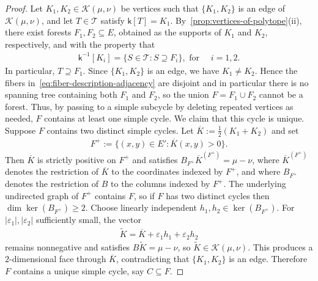 \documentclass[10pt,a4paper]{amsart}
\newcommand{\setoftrees}{{\mathcal{T}}}
\newcommand{\embedding}{{\mathsf{k}}}
\newcommand{\flowpoly}{{\mathcal{K}}}
\begin{document}
    \begin{proof}
        Let $K_1, K_2\in\flowpoly(\mu,\nu)$ be vertices such that $\{K_1,K_2\}$ is an edge of $\flowpoly(\mu,\nu)$, and let $T\in\setoftrees$ satisfy $\embedding[T]=K_1$. By~\cref{prop:vertices-of-polytope}(ii), there exist forests $F_1,F_2\subseteq E$, obtained as the supports of $K_1$ and $K_2$, respectively, and with the property that
            \begin{align}\label{eq:fiber-description-adjacency}
                \embedding^{-1}[K_i] = \{S\in\setoftrees: S\supseteq F_i\},\text{ for }\quad i=1,2.
            \end{align}
        In particular, $T\supseteq F_1$. Since $\{K_1,K_2\}$ is an edge, we have $K_1\neq K_2$. Hence the fibers in~\cref{eq:fiber-description-adjacency} are disjoint and in particular there is no spanning tree containing both $F_1$ and $F_2$, so the union $F = F_1\cup F_2$ cannot be a forest. Thus, by passing to a simple subcycle by deleting repeated vertices as needed, $F$ contains at least one simple cycle. We claim that this cycle is unique. Suppose $F$ contains two distinct simple cycles. Let $\overline{K} := \tfrac{1}{2}(K_1+K_2)$ and set
            \begin{align*}
                F^+ := \{(x,y)\in E' : \overline{K}(x,y) > 0\}.
            \end{align*}
        Then $\overline{K}$ is strictly positive on $F^+$ and satisfies $B_{F^+}\overline{K}^{(F^+)} = \mu-\nu$, where $\overline{K}^{(F^+)}$ denotes the restriction of $\overline{K}$ to the coordinates indexed by $F^+$, and where $B_{F^+}$ denotes the restriction of $B$ to the columns indexed by $F^+$. The underlying undirected graph of $F^+$ contains $F$, so if $F$ has two distinct cycles then $\dim\ker(B_{F^+})\ge 2$. Choose linearly independent $h_1,h_2\in\ker(B_{F^+})$. For $|\varepsilon_1|,|\varepsilon_2|$ sufficiently small, the vector
            \begin{align*}
                \widetilde{K} = \overline{K} + \varepsilon_1 h_1 + \varepsilon_2 h_2
            \end{align*}
        remains nonnegative and satisfies $B\widetilde{K} = \mu-\nu$, so $\widetilde{K}\in\flowpoly(\mu,\nu)$. This produces a $2$-dimensional face through $\overline{K}$, contradicting that $\{K_1,K_2\}$ is an edge. Therefore $F$ contains a unique simple cycle, say $C\subseteq F$.
        

\end{proof}
\end{document}
